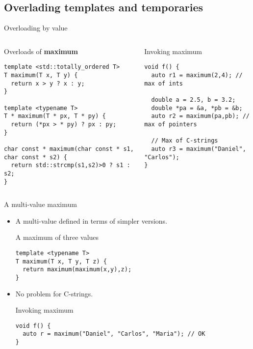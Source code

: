 \subsection{Overlading templates and temporaries}

\begin{frame}[t,fragile]{Overloading by value}

\begin{columns}[T]

\begin{block}{Overloads of \textbf{maximum}}
\begin{lstlisting}
template <std::totally_ordered T>
T maximum(T x, T y) {
  return x > y ? x : y;
}

template <typename T>
T * maximum(T * px, T * py) {
  return (*px > * py) ? px : py;
}

char const * maximum(char const * s1, char const * s2) {
  return std::strcmp(s1,s2)>0 ? s1 : s2;
}
\end{lstlisting}
\end{block}

\pause
{}
\begin{block}{Invoking maximum}
\begin{lstlisting}
void f() {
  auto r1 = maximum(2,4); // max of ints

  double a = 2.5, b = 3.2;
  double *pa = &a, *pb = &b;
  auto r2 = maximum(pa,pb); // max of pointers

  // Max of C-strings
  auto r3 = maximum("Daniel", "Carlos");
}
\end{lstlisting}
\end{block}

\end{columns}
\end{frame}

\begin{frame}[t,fragile]{A multi-value maximum}
\begin{itemize}
  \item A multi-value  defined in terms of simpler versions.

\begin{block}{A maximum of three values}
\begin{lstlisting}
template <typename T>
T maximum(T x, T y, T z) {
  return maximum(maximum(x,y),z);
}
\end{lstlisting}
\end{block}

  \item No problem for C-strings.

\begin{block}{Invoking maximum}
\begin{lstlisting}
void f() {
  auto r = maximum("Daniel", "Carlos", "Maria"); // OK
}
\end{lstlisting}
\end{block}

\end{itemize}
\end{frame}

